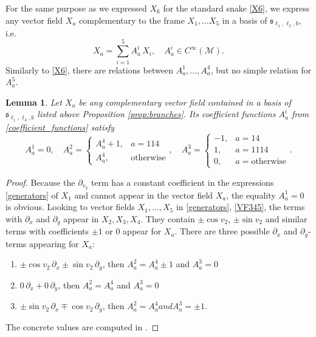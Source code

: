 \documentclass{amsart}
\theoremstyle{plain}
\newtheorem{lemma}[theorem]{Lemma}
\theoremstyle{definition}
\theoremstyle{remark}
\newcommand{\mc}[1]{\mathcal{#1}}
\newcommand{\mfk}[1]{\mathfrak{#1}}
\begin{document}
For the same purpose as we expressed $X_6$ for the standard snake \eqref{X6}, we express any vector field $X_a$ complementary to the frame $X_1, \dots X_5$ in a basis of $\mfk{s}_{\ell_1, \ell_3,b}$, i.e.
\begin{equation}\label{coefficient_functions}
    X_a = \sum_{i=1}^5 A_a^i\, X_i,\quad A_a^i \in C^\infty(\mc{M}).
\end{equation}
Similarly to \eqref{X6}, there are relations between $A_a^1, \dots, A_a^4$, but no simple relation for $A_a^5$.
\begin{lemma} \label{lemma:Aai_relations}
    Let $X_a$ be any complementary vector field contained in a basis of $\mfk{s}_{\ell_1, \ell_3,b}$ listed above Proposition \ref{prop:branches}. Its coefficient functions $A_a^i$ from \eqref{coefficient_functions} satisfy
    \begin{equation} \label{Aai_relations}
        A_a^1 = 0,\quad
        A_a^2 = 
        \begin{cases}
            A_a^4 + 1, & a = 114 \\
            A_a^4, & \text{otherwise}
        \end{cases},\quad
        A_a^3 =
        \begin{cases}
            -1, & a = 14\\
            1, & a=1114\\
            0, & a=\text{otherwise}
        \end{cases}.
    \end{equation}
\end{lemma}
\begin{proof}
    Because the $\partial_{v_2}$ term has a constant coefficient in the expressions \eqref{generators} of $X_1$ and cannot appear in the vector field $X_a$, the equality $A_a^1 = 0$ is obvious. Looking to vector fields $X_1, \dots, X_5$ in \eqref{generators}, \eqref{VF345}, the terms with $\partial_x$ and $\partial_y$ appear in $X_2,X_3,X_4$. They contain $\pm\cos v_2$, $\pm\sin v_2$ and similar terms with coefficients $\pm 1$ or $0$ appear for $X_a$. There are three possible $\partial_x$ and $\partial_y$-terms appearing for $X_a$:
    \begin{enumerate}[label=\arabic*)]
        \item $\pm \cos v_2\,\partial_x \pm \sin v_2\,\partial_y$, then $A^2_a = A^4_a \pm 1$ and $A^3_a = 0$
        \item $0\,\partial_x + 0\,\partial_y$, then $A^2_a = A^4_a$ and $A^3_a = 0$
        \item $\pm \sin v_2\,\partial_x \mp \cos v_2\,\partial_y$, then $A^2_a = A^4_a and A^3_a = \pm 1$.
    \end{enumerate}
    The concrete values are computed in \cite[\texttt{vectorfields.mw}]{attached_files}.
\end{proof}
\end{document}
